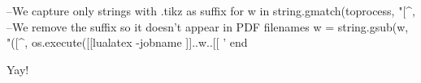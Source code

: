 \documentclass{article}
\begin{document}
\begin{luacode*}
--We capture only strings with .tikz as suffix
for w in string.gmatch(toprocess, "[^,%
--We remove the suffix so it doesn't appear in PDF filenames
    w = string.gsub(w, "([^,%
    os.execute([[lualatex -jobname ]]..w..[[ '\def\zzz{]]..w..[[.tikz} 
end
\end{luacode*}
Yay! %
\end{document}
